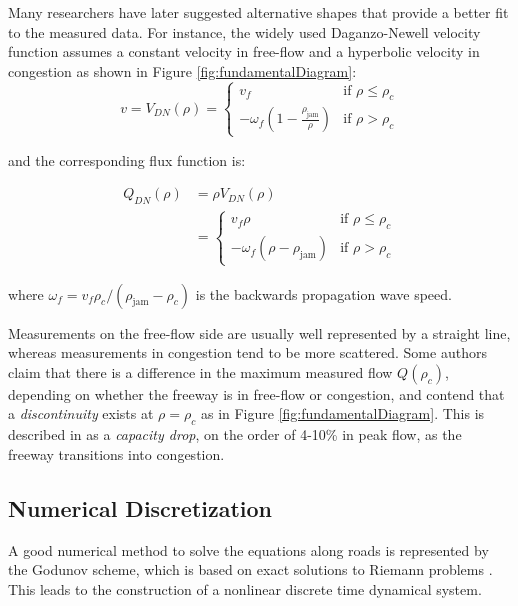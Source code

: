 Many researchers have later suggested alternative shapes that provide a better fit to the measured data. For instance, the widely used Daganzo-Newell velocity function assumes a constant velocity in free-flow and a hyperbolic velocity in congestion as shown in Figure \ref{fig:fundamentalDiagram}:
\noindent 
\begin{equation}\label{eq:dnVelocity}
v = V_{DN}(\rho) = \begin{cases}
v_{f} & \text{if } \rho \leq \rho_{c} \\
-\omega_{f} \left( 1 - \frac{\rho_{\text{jam}}}{\rho} \right) & \text{if } \rho > \rho_{c}
\end{cases}
\end{equation}

\noindent and the corresponding flux function is:

\begin{equation}\label{eq:dnFlux}
\begin{array}{ll}
Q_{DN}(\rho) & = \rho V_{DN}(\rho)\\
 & = \begin{cases}
v_{f} \rho & \text{if } \rho \leq \rho_{c} \\
-\omega_{f} \left( \rho - \rho_{\text{jam}} \right) & \text{if } \rho > \rho_{c}
\end{cases}
\end{array}
\end{equation}

\noindent where $\omega_{f}=v_{f}\rho_{c}/(\rho_{\text{jam}}-\rho_{c})$ is the backwards propagation wave speed.

Measurements on the free-flow side are usually well represented by a straight line, whereas measurements in congestion tend to be more scattered. Some authors claim that there is a difference in the maximum measured flow $Q(\rho_{c})$, depending on whether the freeway is in free-flow or congestion, and contend that a \textit{discontinuity} exists at $\rho=\rho_{c}$ as in Figure \ref{fig:fundamentalDiagram}. This is described in \cite{Agyemang-Duah1991,Cassidy1999,Hall1991} as a \textit{capacity drop}, on the order of 4-10\% in peak flow, as the freeway transitions into congestion.

\subsection{Numerical Discretization}

A good numerical method to solve the equations along roads is represented by the Godunov scheme, which is based on exact solutions to Riemann problems \cite{Godlewski1996,Godunov1959}. This leads to the construction of a nonlinear discrete time dynamical system.

